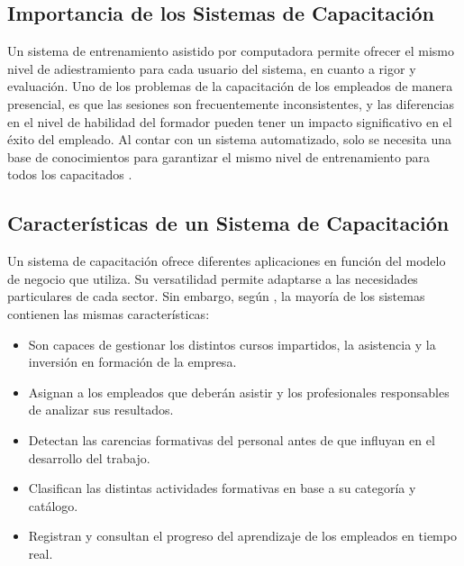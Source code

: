 \subsection{Importancia de los Sistemas de Capacitación}
Un sistema de entrenamiento asistido por computadora permite ofrecer el mismo nivel de adiestramiento para cada usuario del sistema, en cuanto a rigor y evaluación. Uno de los problemas de la capacitación de los empleados de manera presencial, es que las sesiones son frecuentemente inconsistentes, y las diferencias en el nivel de habilidad del formador pueden tener un impacto significativo en el éxito del empleado. Al contar con un sistema automatizado, solo se necesita una base de conocimientos para garantizar el mismo nivel de entrenamiento para todos los capacitados \cite{cap2002}.

\subsection{Características de un Sistema de Capacitación}
Un sistema de capacitación ofrece diferentes aplicaciones en función del modelo de negocio que utiliza. Su versatilidad permite adaptarse a las necesidades particulares de cada sector. Sin embargo, según \cite{softDoit}, la mayoría de los sistemas contienen las mismas características:
\begin{itemize}
\item Son capaces de gestionar los distintos cursos impartidos, la asistencia y la inversión en formación de la empresa.
\item Asignan a los empleados que deberán asistir y los profesionales responsables de analizar sus resultados.
\item Detectan las carencias formativas del personal antes de que influyan en el desarrollo del trabajo.
\item Clasifican las distintas actividades formativas en base a su categoría y catálogo.
\item Registran y consultan el progreso del aprendizaje de los empleados en tiempo real.
\end{itemize}

